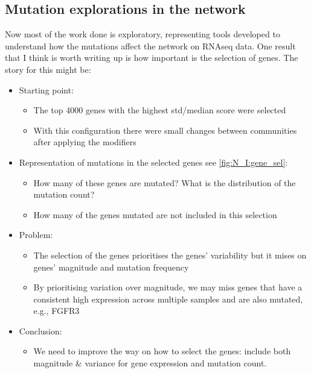 \subsection{Mutation explorations in the network} \label{Sec:N_I:gene_sel}

Now most of the work done is exploratory, representing tools developed to understand how the mutations affect the network on RNAseq data. One result that I think is worth writing up is how important is the selection of genes. The story for this might be:
\begin{itemize}
    \item Starting point:
          \begin{itemize}
              \item The top 4000 genes with the highest std/median score were selected
              \item With this configuration there were small changes between communities after applying the modifiers
          \end{itemize}
    \item Representation of mutations in the selected genes see \ref*{fig:N_I:gene_sel}:
          \begin{itemize}
              \item How many of these genes are mutated? What is the distribution of the mutation count?
              \item How many of the genes mutated are not included in this selection
          \end{itemize}
    \item Problem:
          \begin{itemize}
              \item The selection of the genes prioritises the genes' variability but it mises on genes' magnitude and mutation frequency
              \item By prioritising variation over magnitude, we may miss genes that have a consistent high expression across multiple samples and are also mutated, e.g., FGFR3
          \end{itemize}
    \item Conclusion:
          \begin{itemize}
              \item We need to improve the way on how to select the genes: include both magnitude \& variance for gene expression and mutation count.
          \end{itemize}
\end{itemize}

